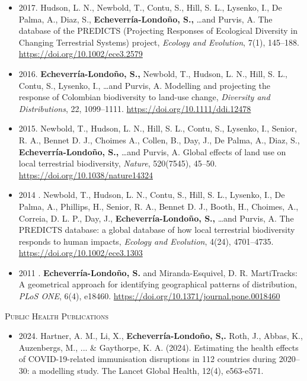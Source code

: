 \documentclass[10pt, a4paper]{article}
\newcommand{\headright}[1]{\vspace*{2.5ex}\textsc{\Large\color{cvblue}#1}\par%
     \vspace*{-2ex}{\color{cvblue}\hrulefill}\par}
\begin{document}
\begin{minipage}[t]{0.9\textwidth}
\begin{itemize}
\item 2017. Hudson, L. N., Newbold, T., Contu, S., Hill, S. L., Lysenko, I., De Palma, A., Diaz, S., \textbf{Echeverr\'ia-Londo\~no, S.,} \dots and Purvis, A. The database of the PREDICTS (Projecting Responses of Ecological Diversity in Changing Terrestrial Systems) project, \textit{Ecology and Evolution}, 7(1), 145--188. \url{https://doi.org/10.1002/ece3.2579}

\item 2016. \textbf{Echeverr\'ia-Londo\~no, S.,} Newbold, T., Hudson, L. N., Hill, S. L., Contu, S., Lysenko, I., \dots and Purvis, A. Modelling and projecting the response of Colombian biodiversity to land-use change, \textit{Diversity and Distributions}, 22, 1099--1111. \url{https://doi.org/10.1111/ddi.12478}

\item 2015. Newbold, T., Hudson, L. N., Hill, S. L., Contu, S., Lysenko, I., Senior, R. A., Bennet D. J., Choimes A., Collen, B., Day, J., De Palma, A., Diaz, S., \textbf{Echeverr\'ia-Londo\~no, S.,} \dots and Purvis, A. Global effects of land use on local terrestrial biodiversity, \textit{Nature}, 520(7545), 45--50. \url{https://doi.org/10.1038/nature14324}

\item 2014 . Newbold, T., Hudson, L. N., Contu, S.,  Hill, S. L., Lysenko, I., De Palma, A., Phillips, H., Senior, R. A., Bennet D. J., Booth, H., Choimes, A., Correia, D. L. P., Day, J., \textbf{Echeverr\'ia-Londo\~no, S.,} \dots and Purvis, A. The PREDICTS database: a global database of how local terrestrial biodiversity responds to human impacts, \textit{Ecology and Evolution}, 4(24), 4701--4735. \url{https://doi.org/10.1002/ece3.1303}

\item 2011 . \textbf{Echeverr\'ia-Londo\~no, S.} and Miranda-Esquivel, D. R. MartiTracks: A geometrical approach for identifying geographical patterns of distribution, \textit{PLoS ONE}, 6(4), e18460. \url{https://doi.org/10.1371/journal.pone.0018460}

\end{itemize}

\headright{Public Health Publications}

\small

\begin{itemize}
\setlength\itemsep{0.6em}

\item 2024. Hartner, A. M., Li, X., \textbf{Echeverr\'ia-Londo\~no, S,.}  Roth, J., Abbas, K., Auzenbergs, M., ... \& Gaythorpe, K. A. (2024). Estimating the health effects of COVID-19-related immunisation disruptions in 112 countries during 2020–30: a modelling study. The Lancet Global Health, 12(4), e563-e571.


\end{itemize}
\end{minipage}
\end{document}
